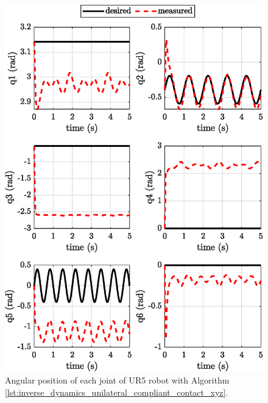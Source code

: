 \begin{figure}[H]
    \centering
    \includegraphics{images/act_2.7_xyz/joint_position.eps}
    \caption{Angular position of each joint of UR5 robot with Algorithm \ref{lst:inverse_dynamics_unilateral_compliant_contact_xyz}.}
    \label{fig:act_2.7_xyz_joint_position}
\end{figure}

